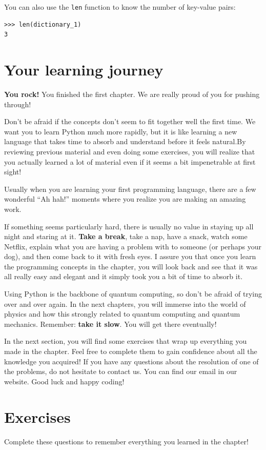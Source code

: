 You can also use the \texttt{len} function to know the number of key-value pairs:
\begin{verbatim}
>>> len(dictionary_1)
3
\end{verbatim}

\section{Your learning journey}
\textbf{You rock!} You finished the first chapter. We are really proud of you for pushing through! 

Don’t be afraid if the concepts don’t seem to fit together well the first time. We want you to learn Python much more rapidly, but it is like learning a new language that takes time to absorb and understand before it feels natural.By reviewing previous material and even doing some exercises, you will realize that you actually learned a lot of material even if it seems a bit impenetrable at first sight! 

Usually when you are learning your first programming language, there are a few wonderful “Ah hah!” moments where you realize you are making an amazing work.

If something seems particularly hard, there is usually no value in staying up all night and staring at it. \textbf{Take a break}, take a nap, have a snack, watch some Netflix, explain what you are having a problem with to someone (or perhaps your dog), and then come back to it with fresh eyes. I assure you that once you learn the programming concepts in the chapter, you will look back and see that it was all really easy and elegant and it simply took you a bit of time to absorb it.

Using Python is the backbone of quantum computing, so don't be afraid of trying over and over again. In the next chapters, you will immerse into the world of physics and how this strongly related to quantum computing and quantum mechanics. Remember: \textbf{take it slow}. You will get there eventually!

In the next section, you will find some exercises that wrap up everything you made in the chapter. Feel free to complete them to gain confidence about all the knowledge you acquired! If you have any questions about the resolution of one of the problems, do not hesitate to contact us. You can find our email in our website. Good luck and happy coding!

\section{Exercises}
Complete these questions to remember everything you learned in the chapter!

